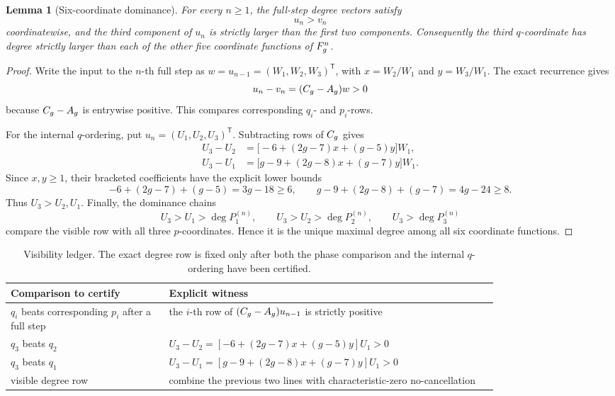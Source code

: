 \documentclass[11pt]{article}
\newtheorem{lemma}[theorem]{Lemma}
\theoremstyle{remark}
\numberwithin{equation}{section}
\begin{document}
\begin{lemma}[Six-coordinate dominance]\label{lem:six-dominance}
For every \(n\geq1\), the full-step degree vectors satisfy
\[
u_n>v_n
\]
coordinatewise, and the third component of \(u_n\) is strictly larger than
the first two components.  Consequently the third \(q\)-coordinate has degree
strictly larger than each of the other five coordinate functions of
\(F_g^n\).
\end{lemma}

\begin{proof}
Write the input to the \(n\)-th full step as
\(w=u_{n-1}=(W_1,W_2,W_3)^{\mathsf T}\), with
\(x=W_2/W_1\) and \(y=W_3/W_1\).  The exact recurrence gives
\[
u_n-v_n=(C_g-A_g)w>0
\]
because \(C_g-A_g\) is entrywise positive.  This compares corresponding
\(q_i\)- and \(p_i\)-rows.

For the internal \(q\)-ordering, put
\(u_n=(U_1,U_2,U_3)^{\mathsf T}\).  Subtracting rows of \(C_g\) gives
\begin{align*}
U_3-U_2
&=\bigl[-6+(2g-7)x+(g-5)y\bigr]W_1,\\
U_3-U_1
&=\bigl[g-9+(2g-8)x+(g-7)y\bigr]W_1.
\end{align*}
Since \(x,y\geq1\), their bracketed coefficients have the explicit lower
bounds
\[
-6+(2g-7)+(g-5)=3g-18\geq6,
\qquad
g-9+(2g-8)+(g-7)=4g-24\geq8.
\]
Thus \(U_3>U_2,U_1\).  Finally, the dominance chains
\[
U_3>U_1>\deg P^{(n)}_1,
\qquad
U_3>U_2>\deg P^{(n)}_2,
\qquad
U_3>\deg P^{(n)}_3
\]
compare the visible row with all three \(p\)-coordinates.  Hence it is the
unique maximal degree among all six coordinate functions.
\end{proof}

\begin{table}[t]
\centering
\small
\begin{tabular}{p{0.26\linewidth}p{0.54\linewidth}}
\toprule
Comparison to certify & Explicit witness \\
\midrule
\(q_i\) beats corresponding \(p_i\) after a full step & the \(i\)-th row of \((C_g-A_g)u_{n-1}\) is strictly positive \\
\(q_3\) beats \(q_2\) & \(U_3-U_2=[-6+(2g-7)x+(g-5)y]U_1>0\) \\
\(q_3\) beats \(q_1\) & \(U_3-U_1=[g-9+(2g-8)x+(g-7)y]U_1>0\) \\
visible degree row & combine the previous two lines with characteristic-zero no-cancellation \\
\bottomrule
\end{tabular}
\caption{Visibility ledger.  The exact degree row is fixed only after both the phase comparison and the internal \(q\)-ordering have been certified.}
\label{tab:visibility}
\end{table}
\end{document}
